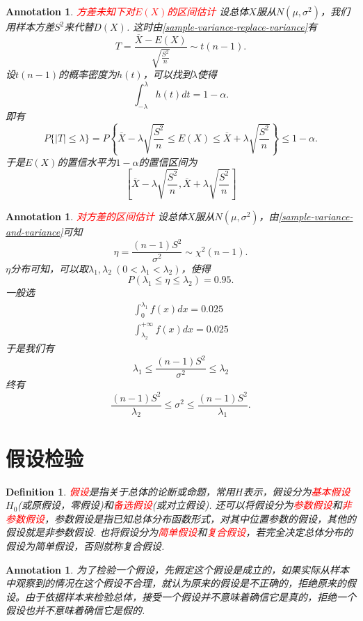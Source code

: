 \documentclass{article}
\newtheorem{definition}[theorem]{Definition}
\newtheorem{annotation}[theorem]{Annotation}
\newcommand{\redt}[1]{\textcolor{red}{#1}}
\begin{document}
\begin{annotation}
\rm \redt{方差未知下对$E(X)$的区间估计} 设总体$X$服从$N(\mu,\sigma^2)$，我们用样本方差$S^2$来代替$D(X)$. 这时由\ref{sample-variance-replace-variance}有
$$
T=\frac{\overline{X}-E(X)}{\sqrt{\frac{S^2}{n}}} \sim t(n-1).
$$
设$t(n-1)$的概率密度为$h(t)$，可以找到$\lambda$使得
$$
\int_{-\lambda}^{\lambda} h(t)dt = 1-\alpha.
$$
即有
$$
P\{|T| \leq \lambda \} = P\left\{ \overline{X} - \lambda \sqrt{\frac{S^2}{n}} \leq E(X) \leq  \overline{X} + \lambda \sqrt{\frac{S^2}{n}} \right\} \leq 1-\alpha.
$$
于是$E(X)$的置信水平为$1-\alpha$的置信区间为
$$
\left[ \overline{X} - \lambda \sqrt{\frac{S^2}{n}} ,  \overline{X} + \lambda \sqrt{\frac{S^2}{n}} \right]
$$
\end{annotation}

\begin{annotation}
\rm \redt{对方差的区间估计} 设总体$X$服从$N(\mu,\sigma^2)$，由\ref{sample-variance-and-variance}可知
$$
\eta = \frac{(n-1)S^2}{\sigma^2} \sim \chi^2(n-1).
$$
$\eta$分布可知，可以取$\lambda_1,\lambda_2~(0 < \lambda_1 < \lambda_2)$，使得
$$
P(\lambda_1 \leq \eta \leq \lambda_2) = 0.95.
$$
一般选
$$
\begin{array}{ll}
\int_{0}^{\lambda_1} f(x)dx = 0.025 \\
\int_{\lambda_2}^{+\infty} f(x)dx = 0.025
\end{array}
$$
于是我们有
$$
\lambda_1 \leq \frac{(n-1)S^2}{\sigma^2} \leq \lambda_2
$$
终有
$$
\frac{(n-1)S^2}{\lambda_2} \leq \sigma^2 \leq \frac{(n-1)S^2}{\lambda_1}. 
$$
\end{annotation}


\newpage
 \section{假设检验}

\begin{definition}
\rm \redt{假设}是指关于总体的论断或命题，常用$H$表示，假设分为\redt{基本假设}$H_0$(或原假设，零假设)和\redt{备选假设}(或对立假设). 还可以将假设分为\redt{参数假设}和\redt{非参数假设}，参数假设是指已知总体分布函数形式，对其中位置参数的假设，其他的假设就是非参数假设. 也将假设分为\redt{简单假设}和\redt{复合假设}，若完全决定总体分布的假设为简单假设，否则就称复合假设.
\end{definition}

\begin{annotation}
\rm 为了检验一个假设，先假定这个假设是成立的，如果实际从样本中观察到的情况在这个假设不合理，就认为原来的假设是不正确的，拒绝原来的假设。由于依据样本来检验总体，接受一个假设并不意味着确信它是真的，拒绝一个假设也并不意味着确信它是假的. 
\end{annotation}
\end{document}
